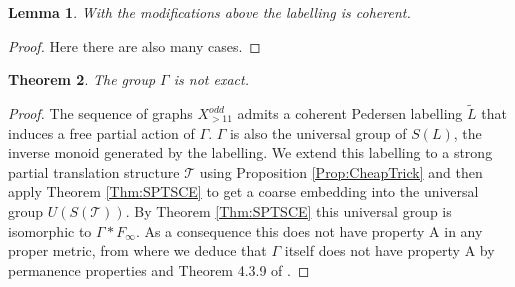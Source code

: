 \documentclass[11pt,a4paper]{amsart}
\theoremstyle{plain}
\newtheorem{theorem}{Theorem}%
\newtheorem{lemma}[theorem]{Lemma}%
\theoremstyle{definition}%
\theoremstyle{remark}%
\begin{document}
\begin{lemma}
With the modifications above the labelling is coherent.
\end{lemma}
\begin{proof}
Here there are also many cases. 
\end{proof}


\begin{theorem}
The group $\Gamma$ is not exact.
\end{theorem}
\begin{proof}
The sequence of graphs $X_{>11}^{odd}$ admits a coherent Pedersen labelling $\tilde{L}$ that induces a free partial action of $\Gamma$. $\Gamma$ is also the universal group of $S(L)$, the inverse monoid generated by the labelling. We extend this labelling to a strong partial translation structure $\mathcal{T}$ using Proposition \ref{Prop:CheapTrick} and then apply Theorem \ref{Thm:SPTSCE} to get a coarse embedding into the universal group $U(S(\mathcal{T}))$. By Theorem \ref{Thm:SPTSCE} this universal group is isomorphic to $\Gamma \ast F_{\infty}$. As a consequence this does not have property A in any proper metric, from where we deduce that $\Gamma$ itself does not have property A by permanence properties \cite[Guentner]{} and Theorem 4.3.9 of \cite[Rufus' notes on A]{}. 
\end{proof}




\end{document}
